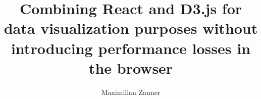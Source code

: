 \documentclass[master,english]{hgbthesis}
\title{Combining React and D3.js for data visualization purposes without introducing performance losses in the browser}
\author{Maximilian Zauner}
\begin{document}

\frontmatter							%

\maketitle
\tableofcontents




\mainmatter          			%









%

\MakeBibliography                        				%



\end{document}
